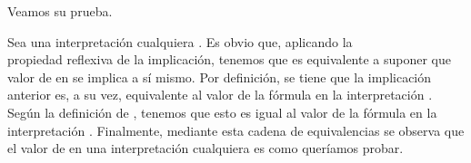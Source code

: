 \begin{isabellebody}
\begin{isamarkuptext}
  Veamos su prueba.

  \begin{demostracion}
    Sea una interpretación cualquiera \isa{{\isasymA}}. Es obvio que, aplicando la\\
    propiedad reflexiva de la implicación, tenemos que  es
    equivalente a suponer que valor de \isa{{\isasymbottom}} en \isa{{\isasymA}} se implica a sí 
    mismo. Por definición, se tiene que la implicación anterior es, a 
    su vez, equivalente al valor de la fórmula \isa{{\isasymbottom}\ {\isasymrightarrow}\ {\isasymbottom}} en la 
    interpretación \isa{{\isasymA}}. Según la definición de \isa{{\isasymtop}}, tenemos que esto es
    igual al valor de la fórmula \isa{{\isasymtop}} en la interpretación \isa{{\isasymA}}.
    Finalmente, mediante esta cadena de equivalencias se observa que
    el valor de \isa{{\isasymtop}} en una interpretación \isa{{\isasymA}} cualquiera es 
     como queríamos probar.    
  \end{demostracion}


\end{isamarkuptext}
\end{isabellebody}
